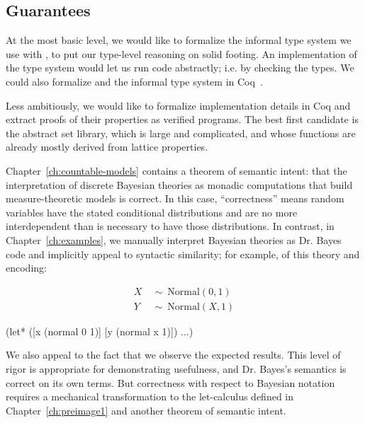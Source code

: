 \subsection{Guarantees}


At the most basic level, we would like to formalize the informal type system we use with \lzfclang, to put our type-level reasoning on solid footing.
An implementation of the type system would let us run \lzfclang code abstractly; i.e. by checking the types.
We could also formalize \lzfclang and the informal type system in Coq~\cite{cit:coq-manual}.

Less ambitiously, we would like to formalize implementation details in Coq and extract proofs of their properties as verified programs.
The best first candidate is the abstract set library, which is large and complicated, and whose functions are already mostly derived from lattice properties.

Chapter~\ref{ch:countable-models} contains a theorem of semantic intent: that the interpretation of discrete Bayesian theories as monadic computations that build measure-theoretic models is correct.
In this case, ``correctness'' means random variables have the stated conditional distributions and are no more interdependent than is necessary to have those distributions.
In contrast, in Chapter~\ref{ch:examples}, we manually interpret Bayesian theories as Dr. Bayes code and implicitly appeal to syntactic similarity; for example, of this theory and encoding:
\begin{center}
\vspace{-\baselineskip}
\begin{minipage}[t]{2in}
\begin{equation*}
\begin{aligned}
	X&\ \sim\ \mathrm{Normal}(0,1) \\
	Y&\ \sim\ \mathrm{Normal}(X,1)
\end{aligned}
\end{equation*}
\end{minipage}
\hspace{0.5in}
\begin{minipage}[t]{2.5in}\singlespacing
\begin{schemedisplay}
(let* ([x  (normal 0 1)]
       [y  (normal x 1)])
  ...)
\end{schemedisplay}
\end{minipage}
\end{center}
We also appeal to the fact that we observe the expected results.
This level of rigor is appropriate for demonstrating usefulness, and Dr. Bayes's semantics is correct on its own terms.
But correctness with respect to Bayesian notation requires a mechanical transformation to the let-calculus defined in Chapter~\ref{ch:preimage1} and another theorem of semantic intent.

